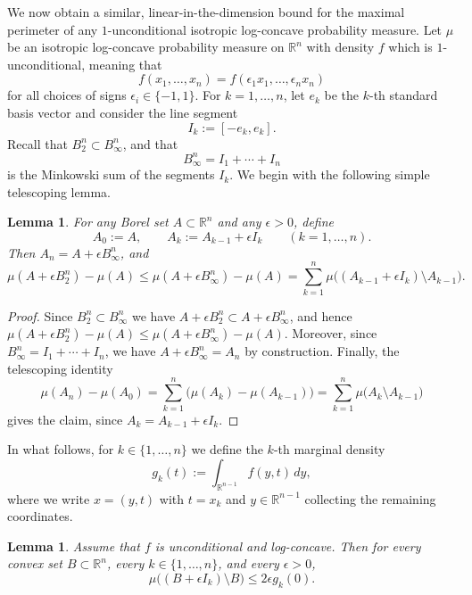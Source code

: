 \documentclass[11pt,leqno]{article}
\newtheorem{lemma}[theorem]{Lemma}
\theoremstyle{remark}
\numberwithin{equation}{section}
\newcommand{\ls}{\leqslant}
\begin{document}
We now obtain a similar, linear-in-the-dimension bound for the maximal perimeter of any $1$-unconditional isotropic log-concave
probability measure. Let $\mu$ be an isotropic log-concave probability measure on $\mathbb{R}^n$ with density $f$ which is $1$-unconditional, 
meaning that $$f(x_1,\ldots,x_n)=f(\epsilon_1 x_1,\ldots,\epsilon_n x_n)$$ for all choices of signs $\epsilon_i\in\{-1,1\}$. 
For $k=1,\dots,n$, let $e_k$ be the $k$-th standard basis vector and consider the line segment
$$I_k:= [-e_k,e_k].$$
Recall that $B_2^n\subset B_\infty^n$, and that 
$$B_\infty^n = I_1+\cdots+I_n$$ is the Minkowski sum of the segments $I_k$.
We begin with the following simple telescoping lemma.

\begin{lemma}\label{lem:telescoping}
For any Borel set $A\subset\mathbb{R}^n$ and any $\epsilon>0$, define
$$A_0:=A,\qquad A_k:=A_{k-1}+\epsilon I_k\qquad(k=1,\dots,n).$$
Then $A_n=A+\epsilon B_\infty^n$, and
$$\mu(A+\epsilon B_2^n)-\mu(A)\ls \mu(A+\epsilon B_\infty^n)-\mu(A)=\sum_{k=1}^n \mu\big((A_{k-1}+\epsilon I_k)\setminus A_{k-1}\big).$$
\end{lemma}

\begin{proof}
Since $B_2^n\subset B_\infty^n$ we have $A+\epsilon B_2^n\subset A+\epsilon B_\infty^n$, and hence
$\mu(A+\epsilon B_2^n)-\mu(A)\ls \mu(A+\epsilon B_\infty^n)-\mu(A)$.
Moreover, since $B_\infty^n=I_1+\cdots+I_n$, we have $A+\epsilon B_\infty^n=A_n$ by construction.
Finally, the telescoping identity
\begin{equation}\label{eq:telescope}\mu(A_n)-\mu(A_0)=\sum_{k=1}^n \big(\mu(A_k)-\mu(A_{k-1})\big)=\sum_{k=1}^n \mu\big(A_k\setminus A_{k-1}\big)\end{equation}
gives the claim, since $A_k=A_{k-1}+\epsilon I_k$.
\end{proof}

In what follows, for $k\in\{1,\dots,n\}$ we define the $k$-th marginal density
$$g_k(t):=\int_{\mathbb{R}^{n-1}} f(y,t)\,dy,$$
where we write $x=(y,t)$ with $t=x_k$ and $y\in\mathbb{R}^{n-1}$ collecting the remaining coordinates.

\begin{lemma}\label{lem:fiber}Assume that $f$ is unconditional and log-concave. Then for every convex set
$B\subset\mathbb{R}^n$, every $k\in\{1,\dots,n\}$, and every $\epsilon>0$,
$$\mu\big((B+\epsilon I_k)\setminus B\big)\ls 2\epsilon g_k(0).$$
\end{lemma}
\end{document}
